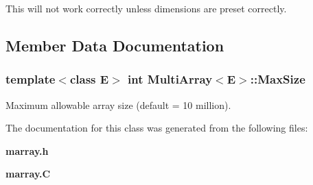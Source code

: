 This will not work correctly unless dimensions are preset correctly.



\subsection{Member Data Documentation}
\subsubsection{\setlength{\rightskip}{0pt plus 5cm}template$<$class E$>$ int Multi\-Array$<$E$>$::Max\-Size}\label{class_MultiArray_m0}


Maximum allowable array size (default = 10 million).



The documentation for this class was generated from the following files:\begin{CompactItemize}
\item 
{\bf marray.h}\item 
{\bf marray.C}\end{CompactItemize}
